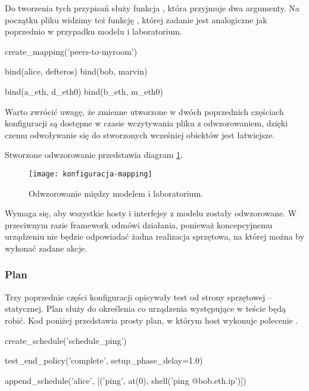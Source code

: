\documentclass[00-praca-magisterska.tex]{subfiles}
\begin{document}
Do tworzenia tych przypisań służy funkcja , która przyjmuje dwa
argumenty. Na początku pliku widzimy też funkcję , której
zadanie jest analogiczne jak poprzednio w przypadku modelu i laboratorium.

\begin{pythoncode}
  create_mapping('peers-to-myroom')

  bind(alice, defteros)
  bind(bob,   marvin)

  bind(a_eth, d_eth0)
  bind(b_eth, m_eth0)
\end{pythoncode}

Warto zwrócić uwagę, że zmienne utworzone w dwóch poprzednich częściach
konfiguracji są dostępne w czasie wczytywania pliku z odwzorowaniem, dzięki czemu
odwoływanie się do stworzonych wcześniej obiektów jest łatwiejsze.

Stworzone odwzorowanie przedstawia diagram \ref{fig:konfiguracja-mapping}.

\begin{figure}[htb]
\begin{center}
\leavevmode
\texttt{[image: konfiguracja-mapping]}
\end{center}
\caption{Odwzorowanie między modelem i laboratorium.}
\label{fig:konfiguracja-mapping}
\end{figure}

Wymaga się, aby wszystkie hosty i interfejsy z modelu zostały odwzorowane. W
przeciwnym razie framework odmówi działania, ponieważ koncepcyjnemu urządzeniu
nie będzie odpowiadać żadna realizacja sprzętowa, na której można by wykonać
zadane akcje.

\subsubsection{Plan}

Trzy poprzednie części konfiguracji opisywały test od strony sprzętowej --
statycznej. Plan służy do określenia co urządzenia występujące w teście będą
robić. Kod poniżej przedstawia prosty plan, w którym host wykonuje polecenie
.

\begin{pythoncode}
  create_schedule('schedule_ping')

  test_end_policy('complete', setup_phase_delay=1.0)

  append_schedule('alice', [('ping', at(0), shell('ping @{bob.eth.ip}')])
\end{pythoncode}
\end{document}
